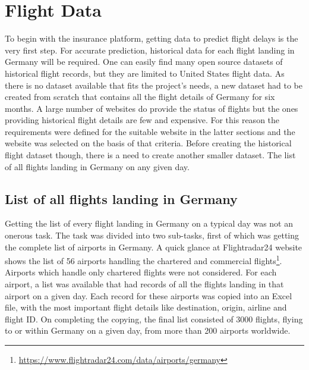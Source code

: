 \chapter{Flight Data}
To begin with the insurance platform, getting data to predict flight delays is the very first step. For accurate prediction, historical data for each flight landing in Germany will be required. One can easily find many open source datasets of historical flight records, but they are limited to United States flight data. As there is no dataset available that fits the project's needs, a new dataset had to be created from scratch that contains all the flight details of Germany for six months. A large number of websites do provide the status of flights but the ones providing historical flight details are few and expensive. For this reason the requirements were defined for the suitable website in the latter sections and the website was selected on the basis of that criteria. Before creating the historical flight dataset though, there is a need to create another smaller dataset. The list of all flights landing in Germany on any given day.

\section{List of all flights landing in Germany}
Getting the list of every flight landing in Germany on a typical day was not an onerous task. The task was divided into two sub-tasks, first of which was getting the complete list of airports in Germany. A quick glance at Flightradar24 website shows the list of 56 airports handling the chartered and commercial flights\footnote{\url{https://www.flightradar24.com/data/airports/germany}}. Airports which handle only chartered flights were not considered. For each airport, a list was available that had records of all the flights landing in that airport on a given day. Each record for these airports was copied into an Excel file, with the most important flight details like destination, origin, airline and flight ID. On completing the copying, the final list consisted of 3000 flights, flying to or within Germany on a given day, from more than 200 airports worldwide.

